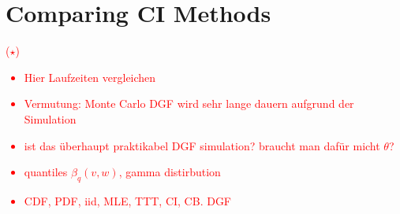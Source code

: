 \chapter{Comparing CI Methods}


\textcolor{red}{($\star$) 
\begin{itemize}
	\item Hier Laufzeiten vergleichen
	\item Vermutung: Monte Carlo DGF wird sehr lange dauern aufgrund der Simulation
	\item ist das überhaupt praktikabel DGF simulation? braucht man dafür micht $\theta$?
	\item 
	quantiles 
	$\beta_q(v, w)$, gamma distirbution
	\item 
	CDF, PDF, iid, MLE, TTT, CI, CB. DGF
\end{itemize}
}